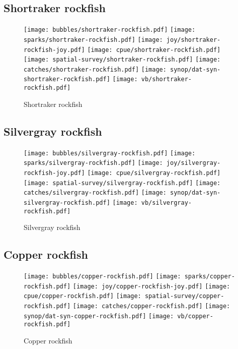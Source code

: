 \subsection*{Shortraker rockfish}

\begin{figure}[htbp]
\centering
\texttt{[image: bubbles/shortraker-rockfish.pdf]}
\texttt{[image: sparks/shortraker-rockfish.pdf]}
\texttt{[image: joy/shortraker-rockfish-joy.pdf]}
\texttt{[image: cpue/shortraker-rockfish.pdf]}
\texttt{[image: spatial-survey/shortraker-rockfish.pdf]}
\texttt{[image: catches/shortraker-rockfish.pdf]}
\texttt{[image: synop/dat-syn-shortraker-rockfish.pdf]}
\texttt{[image: vb/shortraker-rockfish.pdf]}
\caption{Shortraker rockfish}
\end{figure}
\clearpage
\subsection*{Silvergray rockfish}

\begin{figure}[htbp]
\centering
\texttt{[image: bubbles/silvergray-rockfish.pdf]}
\texttt{[image: sparks/silvergray-rockfish.pdf]}
\texttt{[image: joy/silvergray-rockfish-joy.pdf]}
\texttt{[image: cpue/silvergray-rockfish.pdf]}
\texttt{[image: spatial-survey/silvergray-rockfish.pdf]}
\texttt{[image: catches/silvergray-rockfish.pdf]}
\texttt{[image: synop/dat-syn-silvergray-rockfish.pdf]}
\texttt{[image: vb/silvergray-rockfish.pdf]}
\caption{Silvergray rockfish}
\end{figure}
\clearpage
\subsection*{Copper rockfish}

\begin{figure}[htbp]
\centering
\texttt{[image: bubbles/copper-rockfish.pdf]}
\texttt{[image: sparks/copper-rockfish.pdf]}
\texttt{[image: joy/copper-rockfish-joy.pdf]}
\texttt{[image: cpue/copper-rockfish.pdf]}
\texttt{[image: spatial-survey/copper-rockfish.pdf]}
\texttt{[image: catches/copper-rockfish.pdf]}
\texttt{[image: synop/dat-syn-copper-rockfish.pdf]}
\texttt{[image: vb/copper-rockfish.pdf]}
\caption{Copper rockfish}
\end{figure}
\clearpage
